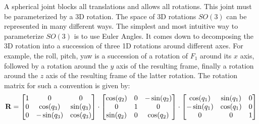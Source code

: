 A spherical joint blocks all translations and allows all rotations.
This joint must be parameterized by a 3D rotation.
The space of 3D rotations $SO(3)$ can be represented in many different ways.
The simplest and most intuitive way to parameterize $SO(3)$ is to use Euler Angles.
It comes down to decomposing the 3D rotation into a succession of three 1D rotations around different axes.
For example, the roll, pitch, yaw is a succession of a rotation of $F_1$ around its $x$ axis, followed by a rotation around the $y$ axis of the resulting frame, finally a rotation around the $z$ axis of the resulting  frame of the latter rotation.
The rotation matrix for such a convention is given by:
\begin{equation}
  {\bf R} =
  \begin{bmatrix}
    1 & 0 & 0 \\
    0 & \cos(q_3) & \sin(q_3) \\
    0 & -\sin(q_3) & \cos(q_3) \\
  \end{bmatrix}
  \cdot
  \begin{bmatrix}
    \cos(q_2) & 0 & -\sin(q_2) \\
    0 & 1 & 0 \\
    \sin(q_2) & 0 & \cos(q_2) \\
  \end{bmatrix}
  \cdot
  \begin{bmatrix}
    \cos(q_1) & \sin(q_1) & 0 \\
    -\sin(q_1) & \cos(q_1) & 0 \\
    0 & 0 & 1
  \end{bmatrix}
\end{equation}

